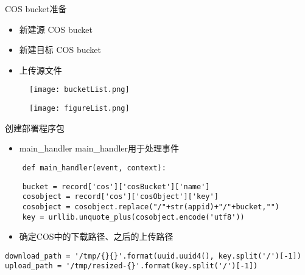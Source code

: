 \documentclass{beamer}
\begin{document}
    \begin{frame}COS bucket准备
        
        \begin{itemize}
        	\item 新建源 COS bucket
        	\item 新建目标 COS bucket
        	\item 上传源文件
        \end{itemize}
         \begin{figure}
         	\centering
         	\texttt{[image: bucketList.png]}
         \end{figure}
          \begin{figure}
         	\centering
         	\texttt{[image: figureList.png]}
         \end{figure}       
    \end{frame}
\begin{frame}[fragile]创建部署程序包
	\begin{itemize}
		\item main\_handler
		main\_handler用于处理事件
	\end{itemize}
	
	
	\begin{verbatim}
	def main_handler(event, context):
	\end{verbatim}
	
	
	\begin{verbatim}
	bucket = record['cos']['cosBucket']['name']
	cosobject = record['cos']['cosObject']['key']
	cosobject = cosobject.replace("/"+str(appid)+"/"+bucket,"")
	key = urllib.unquote_plus(cosobject.encode('utf8'))
	\end{verbatim}
\end{frame}

\begin{frame}[fragile]
\begin{itemize}
	\item 确定COS中的下载路径、之后的上传路径
	
\end{itemize}


\begin{verbatim}
download_path = '/tmp/{}{}'.format(uuid.uuid4(), key.split('/')[-1])
upload_path = '/tmp/resized-{}'.format(key.split('/')[-1])
\end{verbatim}
\end{frame}
\end{document}
